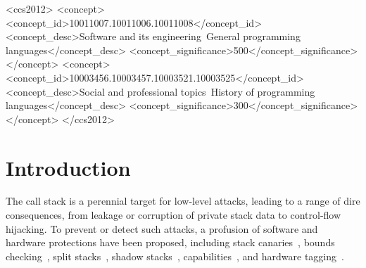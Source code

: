 \documentclass[acmsmall,review,anonymous]{acmart}\settopmatter{printfolios=true,printccs=false,printacmref=false}
\begin{document}
\begin{CCSXML}
<ccs2012>
<concept>
<concept_id>10011007.10011006.10011008</concept_id>
<concept_desc>Software and its engineering~General programming languages</concept_desc>
<concept_significance>500</concept_significance>
</concept>
<concept>
<concept_id>10003456.10003457.10003521.10003525</concept_id>
<concept_desc>Social and professional topics~History of programming languages</concept_desc>
<concept_significance>300</concept_significance>
</concept>
</ccs2012>
\end{CCSXML}



\ifcameraready
{}  %
\fi


\maketitle

\section{Introduction}

The call stack is a perennial target for low-level attacks, leading to a
range of dire consequences, from leakage or corruption of private stack data
to control-flow hijacking. To prevent or detect such attacks, a profusion of
software and hardware protections have been proposed,
%
including stack canaries~\citep{Cowan+98},
bounds checking~\citep{NagarakatteZMZ09,NagarakatteZMZ10,DeviettiBMZ08},
split stacks~\citep{Kuznetsov+14},
shadow stacks~\citep{Dang+15,Shanbhogue+19},
capabilities~\citep{Woodruff+14,Chisnall+15,SkorstengaardLocal,SkorstengaardSTKJFP,Georges+21},
and hardware tagging~\citep{DBLP:conf/sp/RoesslerD18}. \ifaftersubmission{}
\fi
\end{document}
